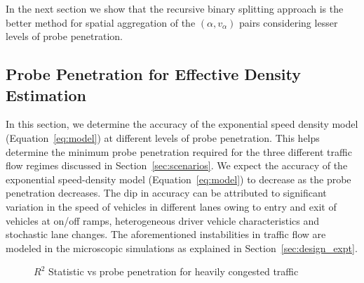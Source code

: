 \documentclass[procedia]{easychair}
\begin{document}
In the next section we show that the recursive binary splitting approach is the better method for spatial aggregation of the  $(\alpha, v_{\alpha})$ pairs considering lesser levels of probe penetration.


  
\subsection{Probe Penetration for Effective Density Estimation}
\label{subsec:penetration}

In this section, we determine the accuracy of the exponential speed density model (Equation~\ref{eq:model}) at different levels of probe penetration. This helps determine the minimum probe penetration required for the three different traffic flow regimes discussed in Section~\ref{sec:scenarios}. We expect the accuracy of the exponential speed-density model (Equation~\ref{eq:model}) to decrease as the probe penetration decreases. The dip in accuracy can be attributed to significant variation in the speed of vehicles in different lanes owing to entry and exit of vehicles at on/off ramps, heterogeneous driver vehicle characteristics and stochastic lane changes. The aforementioned instabilities in traffic flow are modeled in the microscopic simulations as explained in Section~\ref{sec:design_expt}. 


\begin{figure}[!htbp]
      \centering
      \caption{$R^2$ Statistic vs probe penetration for heavily congested traffic}
      \label{fig:error-vs-penetration}
      \end{figure}
\end{document}
